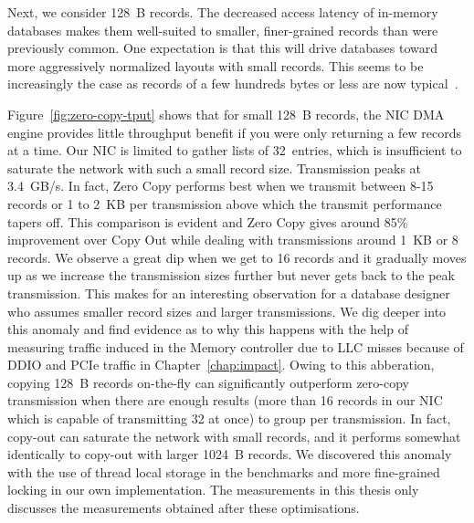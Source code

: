 Next, we consider 128~B records. The decreased access latency of
in-memory databases makes them well-suited to smaller, finer-grained records
than were previously common. One expectation is that this will drive databases
toward more aggressively normalized layouts with small records. This
seems to be increasingly the case as records of a few hundreds bytes or less
are now typical~\cite{fb-memcache,fb-workload}.


Figure~\ref{fig:zero-copy-tput} shows that for small 128~B records, the NIC DMA
engine provides little throughput benefit if you were only returning a few records 
at a time. Our NIC is limited to gather lists
of 32~entries, which is insufficient to saturate the network with such a small
record size. Transmission peaks at 3.4~GB/s. In fact, Zero Copy performs best when
we transmit between 8-15 records or 1 to 2~KB per transmission above which the transmit performance 
tapers off. This comparison is evident and Zero Copy gives around 85\% improvement over Copy Out while dealing 
with transmissions around 1~KB or 8 records. We observe a great dip when we get to 16 records and it gradually moves up as we 
increase the transmission sizes further but never gets back to the peak transmission. This makes 
for an interesting observation for a database designer who assumes smaller record sizes and larger 
transmissions. We dig deeper into this anomaly and find evidence as to why this happens with the 
help of measuring traffic induced in the Memory controller due to LLC misses because of DDIO and 
PCIe traffic in Chapter~\ref{chap:impact}. Owing to this abberation, copying 128~B records 
on-the-fly can significantly outperform zero-copy transmission when there are 
enough results (more than 16 records in our NIC which is capable of transmitting 32 at once) to group per transmission.
In fact, copy-out can saturate the network with small records, and it
performs somewhat identically to copy-out with larger 1024~B records. We discovered this anomaly 
with the use of thread local storage in the benchmarks and more fine-grained locking 
in our own implementation. The measurements in this thesis only discusses the 
measurements obtained after these optimisations.

